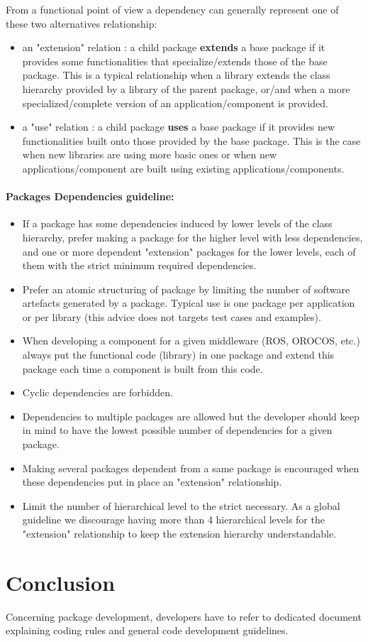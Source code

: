 \documentclass[12pt,a4paper]{article}
\begin{document}
From a functional point of view a dependency can generally represent one of these two alternatives relationship:
\begin{itemize}
\item an "extension" relation : a child package \textbf{extends} a base package if it provides some functionalities that specialize/extends those of the base package. This is a typical relationship when a library extends the class hierarchy provided by a library of the parent package, or/and when a more specialized/complete version of an application/component is provided.
\item a "use" relation : a child package \textbf{uses} a base package if it provides new functionalities built onto those provided by the base package. This is the case when new libraries are using more basic ones or when new applications/component are built using existing applications/components.
\end{itemize}


\paragraph{Packages Dependencies guideline:}
\begin{itemize}
\item If a package has some dependencies induced by lower levels of the class hierarchy, prefer making a package for the higher level with less dependencies, and one or more dependent "extension" packages for the lower levels, each of them with the strict minimum required dependencies.
\item Prefer an atomic structuring of package by limiting the number of software artefacts generated by a package. Typical use is one package per application or per library (this advice does not targets test cases and examples).
\item When developing a component for a given middleware (ROS, OROCOS, etc.) always put the functional code (library) in one package and extend this package each time a component is built from this code.
\item Cyclic dependencies are forbidden.
\item Dependencies to multiple packages are allowed but the developer should keep in mind to have the lowest possible number of dependencies for a given package.
\item Making several packages dependent from a same package is encouraged when these dependencies put in place an "extension" relationship.
\item Limit the number of hierarchical level to the strict necessary. As a global guideline we discourage having more than 4 hierarchical levels for the "extension" relationship to keep the extension hierarchy understandable. 
\end{itemize}



\section*{Conclusion}

Concerning package development, developers have to refer to dedicated document explaining coding rules and general code development guidelines.
\end{document}
